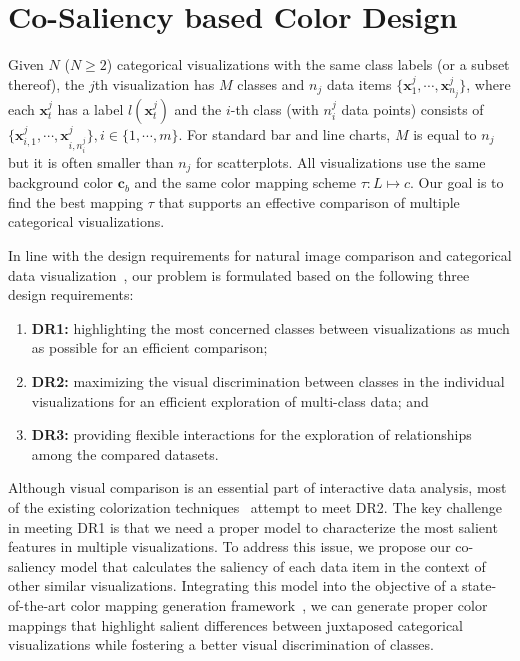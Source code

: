 \section{Co-Saliency based Color Design}
Given $N$ ($N\geq 2$) categorical visualizations with the same class labels (or a subset thereof), the $j$th visualization has $M$ classes and $n_j$ data items $\{\mathbf{x}^j_1, \cdots, \mathbf{x}^j_{n_j}\}$, where each $\mathbf{x}^j_t$ has a label
$l(\mathbf{x}^j_t)$ and the $i$-th class (with $n^j_i$ data points) consists of $\{\mathbf{x}_{i,1}^j, \cdots , \mathbf{x}_{i,n^j_i}^j\}, i \in  \{ 1, \cdots, m \} $.
For standard bar and line charts, $M$ is equal to $n_j$ but it is often smaller than $n_j$ for scatterplots.
All visualizations use the same  background color $\mathbf{c}_b$ and the same color mapping scheme $\tau: L \mapsto c$. Our goal is to find the best mapping $\tau$ that supports an effective comparison of multiple categorical visualizations.

In line with the design requirements for natural image comparison and categorical data visualization~\cite{Jacobs10,Gleicher18,Lu21},
our problem is formulated based on the following three design requirements:
\begin{enumerate}[label=(\roman*),nosep]
\item \textbf{DR1:} highlighting the most concerned classes between visualizations as much as possible for an efficient comparison;
\item \textbf{DR2:} maximizing the visual discrimination between classes in the individual visualizations for an efficient exploration of multi-class data; and
\item \textbf{DR3:} providing flexible interactions for the exploration of relationships among the compared datasets.
\end{enumerate}
Although visual comparison is an essential part of interactive data analysis, most of  the existing  colorization techniques~\cite{Gramazio17, Lu21} attempt to meet DR2. The key challenge in meeting DR1 is that we need a proper model to characterize the most salient features in multiple visualizations.
To address this issue, we propose our %
co-saliency model that calculates the saliency of each data item in the context of other similar visualizations. Integrating this model into the objective of a state-of-the-art color mapping generation framework~\cite{Lu21}, we can
generate proper color mappings that highlight salient differences between juxtaposed categorical visualizations while fostering a better visual discrimination of classes.

